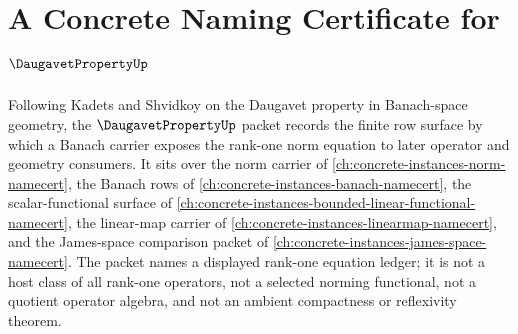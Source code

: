 \chapter{A Concrete Naming Certificate for $\DaugavetPropertyUp$}
\label{ch:concrete-instances-daugavet-property-namecert}

Following Kadets and Shvidkoy on the Daugavet property in Banach-space geometry, the $\DaugavetPropertyUp$ packet records the finite row surface by which a Banach carrier exposes the rank-one norm equation to later operator and geometry consumers. It sits over the norm carrier of \autoref{ch:concrete-instances-norm-namecert}, the Banach rows of \autoref{ch:concrete-instances-banach-namecert}, the scalar-functional surface of \autoref{ch:concrete-instances-bounded-linear-functional-namecert}, the linear-map carrier of \autoref{ch:concrete-instances-linearmap-namecert}, and the James-space comparison packet of \autoref{ch:concrete-instances-james-space-namecert}. The packet names a displayed rank-one equation ledger; it is not a host class of all rank-one operators, not a selected norming functional, not a quotient operator algebra, and not an ambient compactness or reflexivity theorem.

